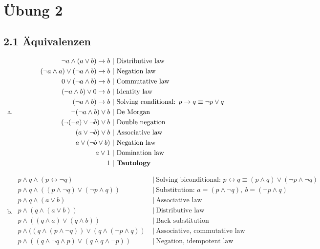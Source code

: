 \documentclass[12pt,a4paper]{article}
\begin{document}
\section*{Übung 2}
\subsection*{2.1 Äquivalenzen}
\begin{enumerate}[a)]
\item
\begin{align*}
\neg a \land (a \lor b) \rightarrow b~&|~\text{Distributive law} \\
(\neg a \land a) \lor (\neg a \land b) \rightarrow b~&|~\text{Negation law}\\
0 \lor (\neg a \land b) \rightarrow b~&|~\text{Commutative law}\\
(\neg a \land b) \lor 0 \rightarrow b~&|~\text{Identity law}\\
(\neg a \land b) \rightarrow b~&|~\text{Solving conditional: } p\rightarrow q \equiv \neg p \lor q \\
\neg (\neg a \land b) \lor b~&|~\text{De Morgan}\\
(\neg (\neg a) \lor \neg b) \lor b~&|~\text{Double negation}\\
(a \lor \neg b) \lor b~&|~\text{Associative law}\\
a \lor (\neg b \lor b)~&|~\text{Negation law}\\
a \lor 1~&|~\text{Domination law}\\
1~&|~\text{\textbf{Tautology}}
\end{align*}
\item
\begin{align*}
p \land q \land (p \leftrightarrow \neg q)~&|~\text{Solving biconditional: } p \leftrightarrow q \equiv (p \land q) \lor (\neg p\land \neg q)\\
p \land q \land ((p \land \neg q) \lor (\neg p\land q))~&|~\text{Substitution: } a = (p \land \neg q),~b=(\neg p \land q)\\
p \land q \land (a \lor b)~&|~\text{Associative law}\\
p \land (q \land (a \lor b))~&|~\text{Distributive law}\\
p \land ((q \land a) \lor (q \land b))~&|~\text{Back-substitution}\\
p \land ((q \land (p \land \neg q)) \lor (q \land (\neg p \land q))~&|~\text{Associative, commutative law}\\
p \land ((q \land \neg q \land p) \lor (q \land q \land \neg p))~&|~\text{Negation, idempotent law}\\

\end{align*}
\end{enumerate}
\end{document}
